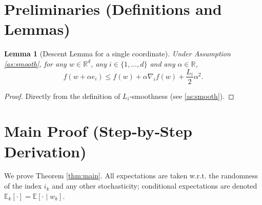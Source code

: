 \documentclass{article}
\newtheorem{lemma}{Lemma}
\begin{document}
\newpage

\section*{Preliminaries (Definitions and Lemmas)}
\begin{lemma}[Descent Lemma for a single coordinate]\label{lem:descent}
Under Assumption \ref{as:smooth}, for any $w\in\mathbb{R}^d$, any $i\in\{1,\dots ,d\}$ and any $\alpha\in\mathbb{R}$,
\[
    f(w+\alpha e_i)\le f(w)+\alpha \nabla_i f(w)+\frac{L_i}{2}\alpha^2 .
\]
\end{lemma}
\begin{proof}
Directly from the definition of $L_i$‑smoothness (see \eqref{as:smooth}). \hfill\qedsymbol
\end{proof}

\section*{Main Proof (Step‑by‑Step Derivation)}
We prove Theorem \ref{thm:main}. All expectations are taken w.r.t. the randomness of the index $i_k$ and any other stochasticity; conditional expectations are denoted $\mathbb{E}_k[\cdot]=\mathbb{E}[\cdot\mid w_k]$.
\end{document}
